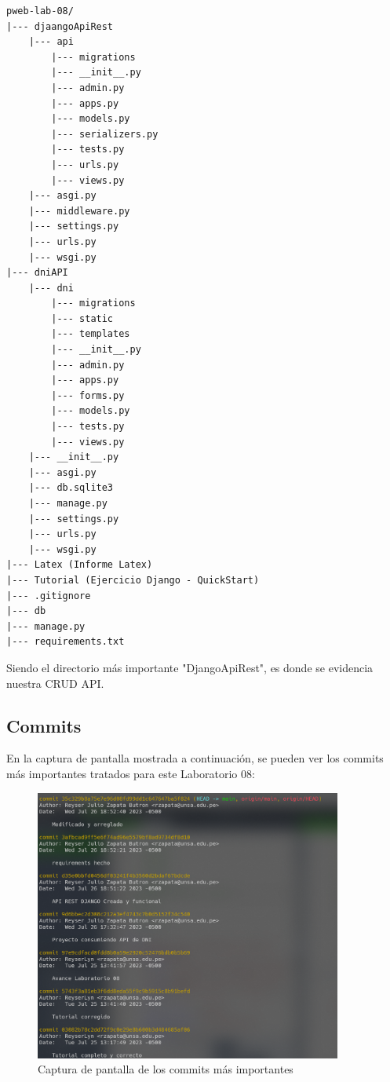 \documentclass{article}
\begin{document}
\begin{lstlisting}[style=ascii-tree]
pweb-lab-08/
|--- djaangoApiRest
    |--- api
        |--- migrations
        |--- __init__.py
        |--- admin.py
        |--- apps.py
        |--- models.py
        |--- serializers.py
        |--- tests.py
        |--- urls.py
        |--- views.py
    |--- asgi.py
    |--- middleware.py
    |--- settings.py
    |--- urls.py
    |--- wsgi.py
|--- dniAPI
    |--- dni
        |--- migrations
        |--- static
        |--- templates
        |--- __init__.py
        |--- admin.py
        |--- apps.py
        |--- forms.py
        |--- models.py
        |--- tests.py
        |--- views.py
    |--- __init__.py
    |--- asgi.py
    |--- db.sqlite3
    |--- manage.py
    |--- settings.py
    |--- urls.py
    |--- wsgi.py
|--- Latex (Informe Latex)
|--- Tutorial (Ejercicio Django - QuickStart)
|--- .gitignore
|--- db
|--- manage.py
|--- requirements.txt

\end{lstlisting}    

Siendo el directorio más importante "DjangoApiRest", es donde se evidencia nuestra CRUD API.

\subsection{Commits}
    En la captura de pantalla mostrada a continuación, se pueden ver los commits más importantes tratados para este Laboratorio 08:
    
       \begin{figure}[H]
            \centering
            \includegraphics[width=0.9\textwidth,keepaspectratio]{img/commits.png}
            \caption{Captura de pantalla de los commits más importantes}
            \label{fig:enter-label}
        \end{figure}
\end{document}
